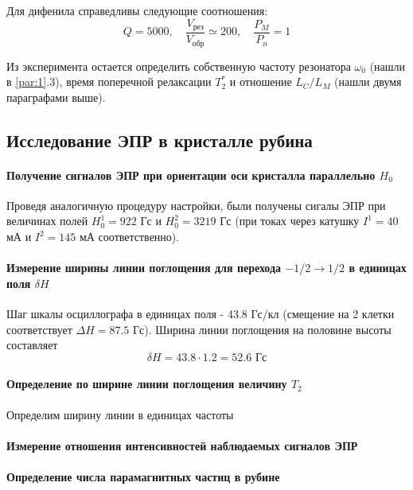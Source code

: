 Для дифенила справедливы следующие соотношения:
\begin{equation}
    \label{eq:}
    Q = 5000, \quad \frac{V_{\text{рез}}}{V_{\text{обр}}} \simeq 200, \quad \frac{P_M}{P_n} = 1
\end{equation}

Из эксперимента остается определить собственную частоту резонатора $\omega_{0}$ (нашли в \ref{par:1}.3), время поперечной релаксации $T^*_2$ и отношение  $L_C / L_M$ (нашли двумя параграфами выше). 

\subsection{Исследование ЭПР в кристалле рубина}%
\paragraph{Получение сигналов ЭПР при ориентации оси кристалла параллельно $H_0$}

Проведя аналогичную процедуру настройки, были получены сигалы ЭПР при величинах полей $H_0^1 = 922$ Гс и $H_0^2 = 3219$ Гс
(при токах через катушку $I^1 = 40$ мА и $I^2 = 145$ мА соответственно).

\paragraph{Измерение ширины линии поглощения для перехода $-1/2\rightarrow 1/2$ в единицах поля $\delta H$}
Шаг шкалы осциллографа в единицах поля - 43.8 Гс/кл (смещение на 2 клетки соответствует $\Delta H = 87.5$ Гс). Ширина линии поглощения
на половине высоты составляет 
\begin{equation}
    \delta H = 43.8 \cdot 1.2 = 52.6 \text{ Гс}
    \label{eq:}
\end{equation}
\paragraph{Определение по ширине линии поглощения величину $T_2$}
Определим ширину линии в единицах частоты

\paragraph{Измерение отношения интенсивностей наблюдаемых сигналов ЭПР}

\paragraph{Определение числа парамагнитных частиц в рубине}

